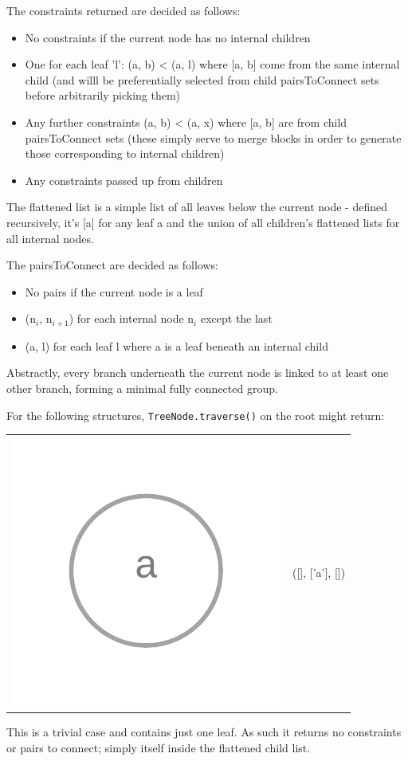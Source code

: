 \documentclass[11pt]{article} %
\begin{document}
The constraints returned are decided as follows:
\begin{itemize}
	\item No constraints if the current node has no internal children
	\item One for each leaf 'l': (a, b) < (a, l) where [a, b] come from the same internal child (and willl be preferentially selected from child pairsToConnect sets before arbitrarily picking them)
	\item Any further constraints (a, b) < (a, x) where [a, b] are from child pairsToConnect sets (these simply serve to merge blocks in order to generate those corresponding to internal children)
	\item Any constraints passed up from children
\end{itemize}

The flattened list is a simple list of all leaves below the current node - defined recursively, it's [a] for any leaf a and the union of all children's flattened lists for all internal nodes.

The pairsToConnect are decided as follows:
\begin{itemize}
	\item No pairs if the current node is a leaf
	\item (n$_i$, n$_{i+1}$) for each internal node n$_i$ except the last
	\item (a, l) for each leaf l where a is a leaf beneath an internal child
\end{itemize}
Abstractly, every branch underneath the current node is linked to at least one other branch, forming a minimal fully connected group. 

For the following structures, \texttt{TreeNode.traverse()} on the root might return:
\begin{center}
\begin{tabular}{>{\centering}m{} >{\centering\arraybackslash}m{}}
	\includegraphics[scale=0.2]{traverse1} & ([], ['a'], [])
\end{tabular}
\end{center}
This is a trivial case and contains just one leaf. As such it returns no constraints or pairs to connect; simply itself inside the flattened child list.
\end{document}
